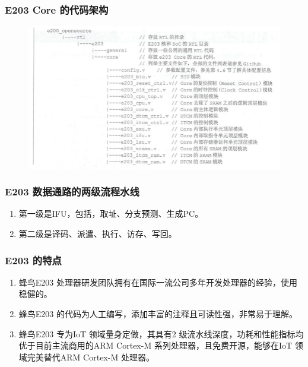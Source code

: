 \documentclass[a4paper, 14pt, oneside]{book} %
\numberwithin{equation}{subsection}
\begin{document}
			\subsubsection{E203 Core 的代码架构}
				\begin{figure}[H]
					\centering
					\includegraphics[scale=0.5]{img/framework.png}   
				\end{figure}

			\subsubsection{E203 数据通路的两级流程水线}
				\begin{enumerate}
					\item 
						第一级是IFU，包括，取址、分支预测、生成PC。
					\item 
						第二级是译码、派遣、执行、访存、写回。
				\end{enumerate}	

			\subsubsection{E203 的特点}
				\begin{enumerate}
					\item 
						蜂鸟E203 处理器研发团队拥有在国际一流公司多年开发处理器的经验，使用稳健的。
					\item 
						蜂鸟E203 的代码为人工编写，添加丰富的注释且可读性强，非常易于理解。
					\item 
						蜂鸟E203 专为IoT 领域量身定做，其具有2 级流水线深度，功耗和性能指标均优于目前主流商用的ARM Cortex-M 系列处理器，且免费开源，能够在IoT 领域完美替代ARM Cortex-M 处理器。
				\end{enumerate}	
\end{document}
